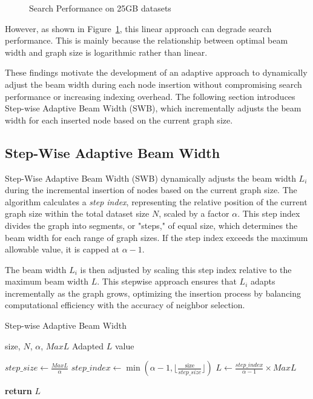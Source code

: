 \begin{figure}[htbp]
    \caption{Search Performance on 25GB datasets}
    \label{fig:oigas:linear}
\end{figure}


However, as shown in Figure~\ref{fig:oigas:linear}, this linear approach can degrade search performance. This is mainly because the relationship between optimal beam width and graph size is logarithmic rather than linear.

These findings motivate the development of an adaptive approach to dynamically adjust the beam width during each node insertion without compromising search performance or increasing indexing overhead. The following section introduces Step-wise Adaptive Beam Width (SWB), which incrementally adjusts the beam width for each inserted node based on the current graph size.

\subsection{Step-Wise Adaptive Beam Width}
Step-Wise Adaptive Beam Width (SWB) dynamically adjusts the beam width \( L_i \) during the incremental insertion of nodes based on the current graph size. The algorithm calculates a \textit{step index}, representing the relative position of the current graph size within the total dataset size \( N \), scaled by a factor \( \alpha \). This step index divides the graph into segments, or "steps," of equal size, which determines the beam width for each range of graph sizes. If the step index exceeds the maximum allowable value, it is capped at \( \alpha - 1 \). 

The beam width \( L_i \) is then adjusted by scaling this step index relative to the maximum beam width \( L \). This stepwise approach ensures that \( L_i \) adapts incrementally as the graph grows, optimizing the insertion process by balancing computational efficiency with the accuracy of neighbor selection.


\begin{algorithm}
\caption{Step-wise Adaptive Beam Width}
\label{alg:sba}
\begin{algorithmic}[1]
\Require size, $N$, $\alpha$, $MaxL$
\Ensure Adapted $L$ value

\State $step\_size \gets \frac{MaxL}{\alpha}$ 
\State $step\_index \gets \min(\alpha - 1, \lfloor \frac{\text{size}}{step\_size} \rfloor)$ 
\State $L \gets \frac{step\_index}{\alpha - 1} \times MaxL$ 

\State \textbf{return} $L$
\end{algorithmic}
\end{algorithm}



